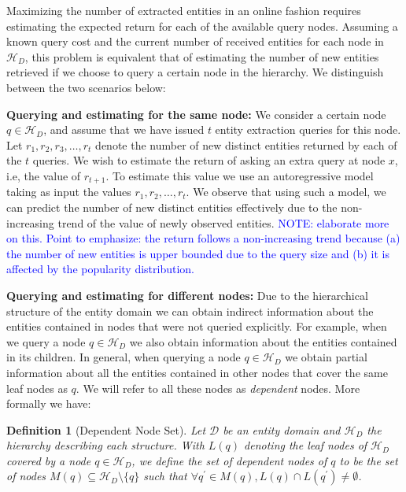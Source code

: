 \documentclass{vldb}
\newcommand{\note}[1]{\textcolor{blue}{{#1}}}
\newtheorem{definition}{Definition}
\newcommand{\domain}{\mathcal{D}}
\newcommand{\hierarchy}{\mathcal{H}_D}
\begin{document}
Maximizing the number of extracted entities in an online fashion requires estimating the expected return for each of the available query nodes. Assuming a known query cost and the current number of received entities for each node in $\hierarchy$,  this problem is equivalent that of estimating the number of new entities retrieved if we choose to query a certain node in the hierarchy. We distinguish between the two scenarios below:

\vspace{5pt}\noindent \textbf{Querying and estimating for the same node:}
We consider a certain node $q \in \hierarchy$, and assume that we have issued $t$ entity extraction queries for this node. Let $r_1, r_2, r_3, \dots, r_t$ denote the number of new distinct entities returned by each of the $t$ queries.  We wish to estimate the return of asking an extra query at node $x$, i.e, the value of $r_{t+1}$. To estimate this value we use an autoregressive model taking as input the values $r_1, r_2, \dots, r_t$. We observe that using such a model, we can predict the number of new distinct entities effectively due to the non-increasing trend of the value of newly observed entities. \note{NOTE: elaborate more on this. Point to emphasize: the return follows a non-increasing trend because (a) the number of new entities is upper bounded due to the query size and (b) it is affected by the popularity distribution.}

\vspace{5pt}\noindent \textbf{Querying and estimating for different nodes:} Due to the hierarchical structure of the entity domain we can obtain indirect information about the entities contained in nodes that were not queried explicitly. For example, when we query a node $q \in \hierarchy$ we also obtain information about the entities contained in its children. In general, when querying a node $q \in \hierarchy$ we obtain partial information about all the entities contained in other nodes that cover the same leaf nodes as $q$. We will refer to all these nodes as {\em dependent} nodes. More formally we have:

\begin{definition}[Dependent Node Set]
Let $\domain$ be an entity domain and $\hierarchy$ the hierarchy describing each structure. With $L(q)$ denoting the leaf nodes of $\hierarchy$ covered by a node $q \in \hierarchy$, we define the set of {\em dependent} nodes of $q$ to be the set of nodes $M(q) \subseteq \hierarchy \setminus \{q\}$ such that $\forall q^{\prime} \in M(q), L(q) \cap L(q^{\prime}) \neq \emptyset$.
\end{definition}
\end{document}
